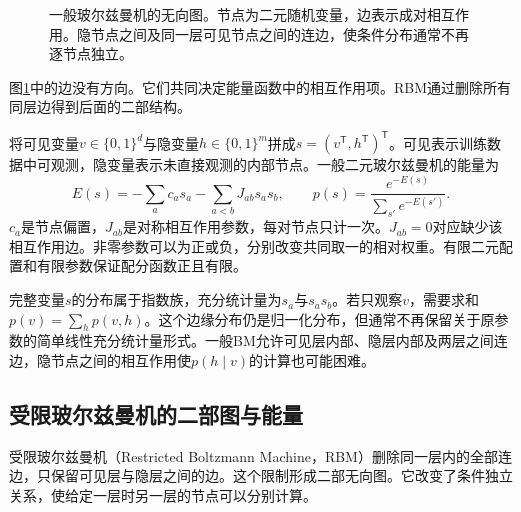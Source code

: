 \begin{figure}[htbp]
\centering
{}
\caption{一般玻尔兹曼机的无向图。节点为二元随机变量，边表示成对相互作用。隐节点之间及同一层可见节点之间的连边，使条件分布通常不再逐节点独立。}
\label{fig:bayes-bm-structure}
\end{figure}

图\ref{fig:bayes-bm-structure}中的边没有方向。它们共同决定能量函数中的相互作用项。RBM通过删除所有同层边得到后面的二部结构。

将可见变量$v\in\{0,1\}^d$与隐变量$h\in\{0,1\}^m$拼成$s=(v^{\mathsf T},h^{\mathsf T})^{\mathsf T}$。可见表示训练数据中可观测，隐变量表示未直接观测的内部节点。一般二元玻尔兹曼机的能量为
\begin{equation}
 E(s)=-\sum_a c_as_a-\sum_{a<b}J_{ab}s_as_b,
 \qquad p(s)=\frac{e^{-E(s)}}{\sum_{s'}e^{-E(s')}}.
\end{equation}
$c_a$是节点偏置，$J_{ab}$是对称相互作用参数，每对节点只计一次。$J_{ab}=0$对应缺少该相互作用边。非零参数可以为正或负，分别改变共同取一的相对权重。有限二元配置和有限参数保证配分函数正且有限。

完整变量$s$的分布属于指数族，充分统计量为$s_a$与$s_as_b$。若只观察$v$，需要求和$p(v)=\sum_h p(v,h)$。这个边缘分布仍是归一化分布，但通常不再保留关于原参数的简单线性充分统计量形式。一般BM允许可见层内部、隐层内部及两层之间连边，隐节点之间的相互作用使$p(h\mid v)$的计算也可能困难。

\subsection{受限玻尔兹曼机的二部图与能量}
受限玻尔兹曼机（Restricted Boltzmann Machine，RBM）删除同一层内的全部连边，只保留可见层与隐层之间的边。这个限制形成二部无向图。它改变了条件独立关系，使给定一层时另一层的节点可以分别计算。

